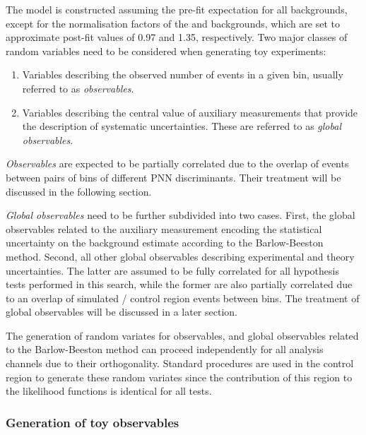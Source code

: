 The model is constructed assuming the pre-fit expectation for all
backgrounds, except for the normalisation factors of the \ttbar and
\ZHF backgrounds, which are set to approximate post-fit values of 0.97
and 1.35, respectively. Two major classes of random variables need to
be considered when generating toy experiments:
\begin{enumerate}
\item Variables describing the observed number of events in a given
  bin, usually referred to as \emph{observables}.

\item Variables describing the central value of auxiliary measurements
  that provide the description of systematic uncertainties. These are
  referred to as \emph{global observables}.
\end{enumerate}

\emph{Observables} are expected to be partially correlated due to the
overlap of events between pairs of bins of different PNN
discriminants. Their treatment will be discussed in the following
section.

\emph{Global observables} need to be further subdivided into two
cases. First, the global observables related to the auxiliary
measurement encoding the statistical uncertainty on the background
estimate %
according to the Barlow-Beeston method. Second, all other global
observables describing experimental and theory uncertainties. The
latter are assumed to be fully correlated for all hypothesis tests
performed in this search, while the former are also partially
correlated due to an overlap of simulated / control region events
between bins. The treatment of global observables will be discussed in
a later section.

The generation of random variates for observables, and global
observables related to the Barlow-Beeston method can proceed
independently for all analysis channels due to their
orthogonality. Standard procedures are used in the control region to
generate these random variates since the contribution of this region
to the likelihood functions is identical for all tests.


\subsubsection{Generation of toy observables}

